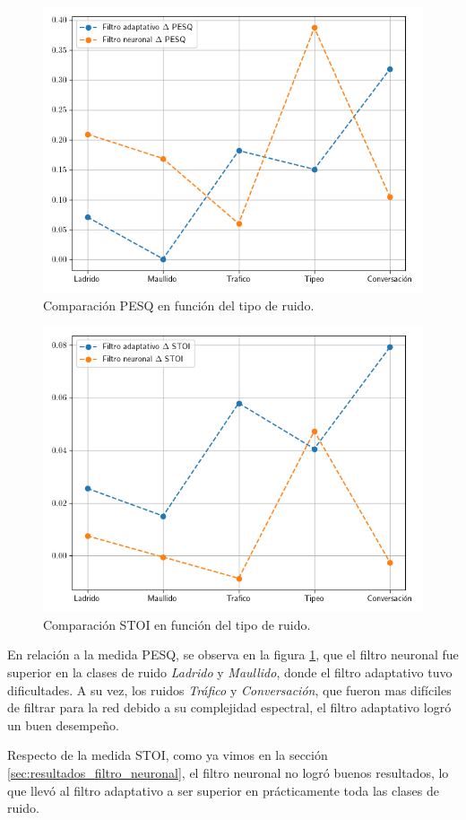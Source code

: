 \begin{figure}
	\centering
	\centerline{\includegraphics[scale=0.75]{images/ch8/comparison_pesq_by_noise.png}}
	\caption{Comparación PESQ en función del tipo de ruido.}
	\label{fig:ch8_pesq_comparison_by_noise}
\end{figure}

\begin{figure}
	\centering
	\centerline{\includegraphics[scale=0.75]{images/ch8/comparison_stoi_by_noise.png}}
	\caption{Comparación STOI en función del tipo de ruido.}
	\label{fig:ch8_stoi_comparison_by_noise}
\end{figure}

En relación a la medida PESQ, se observa en la figura \ref{fig:ch8_pesq_comparison_by_noise}, que el filtro neuronal fue superior en la clases de ruido \emph{Ladrido} y \emph{Maullido}, donde el filtro adaptativo tuvo dificultades. A su vez, los ruidos \emph{Tráfico} y \emph{Conversación}, que fueron mas difíciles de filtrar para la red debido a su complejidad espectral, el filtro adaptativo logró un buen desempeño.

Respecto de la medida STOI, como ya vimos en la sección \ref{sec:resultados_filtro_neuronal}, el filtro neuronal no logró buenos resultados, lo que llevó al filtro adaptativo a ser superior en prácticamente toda las clases de ruido.